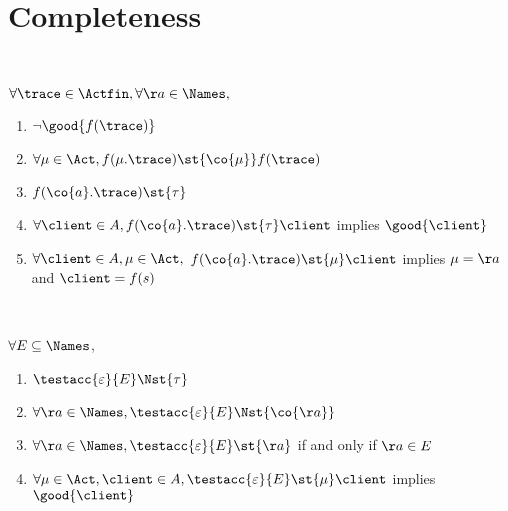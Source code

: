 \section{Completeness}
\label{sec:proof-completeness}
\label{sec:bhv-completeness}


\begin{table*}
  \hrulefill\\

    \begin{minipage}{300pt}%
      $\forall \trace \in \Actfin, \forall \aa \in \Names,$
      \begin{enumerate}[(1)]
      \item
        \label{gen-spec-ungood}
        $ \lnot \good{f(\trace)}$
      \item
        \label{gen-spec-mu-lts-co}
        $ \forall \mu \in \Act, f (\mu.\trace) \st{\co{\mu}} f(\trace)$
      \item
        \label{gen-spec-mu-out-ex-tau}
        $ f (\co{a}.\trace) \st{\tau} $
      \item
        \label{gen-spec-out-good}
        $ \forall \client \in \States, f (\co{a}.\trace)
        \st{\tau} \client$ implies $\good{ \client }$
      \item
        \label{gen-spec-out-mu-inp}
        $ \forall \client \in \States, \mu \in \Act,$
        $f (\co{a}.\trace) \st{\mu} \client$ implies $\mu = \aa$ and
        $\client = f(s)$
      \end{enumerate}
    \end{minipage}
    \\[2em]
    \begin{minipage}{300pt}
      $\forall E \subseteq \Names$,
      \begin{enumerate}[(t1)]
      \item\label{gen-spec-acc-nil-stable-tau}
        $\testacc{\varepsilon}{E} \Nst{\tau}$
      \item\label{gen-spec-acc-nil-stable-out}
        $\forall \aa \in \Names, \testacc{\varepsilon}{E} \Nst{\co{\aa}}$
      \item\label{gen-spec-acc-nil-mem-lts-inp}
        $\forall \aa \in \Names, \testacc{\varepsilon}{E} \st{\aa}$ if and only if
        $\aa \in E$
      \item\label{gen-spec-acc-nil-lts-inp-good}
        $\forall \mu \in \Act, \client \in \States,
        \testacc{\varepsilon}{E} \st{\mu} \client$ implies $\good{\client}$
      \end{enumerate}

\end{minipage}
\end{table*}
